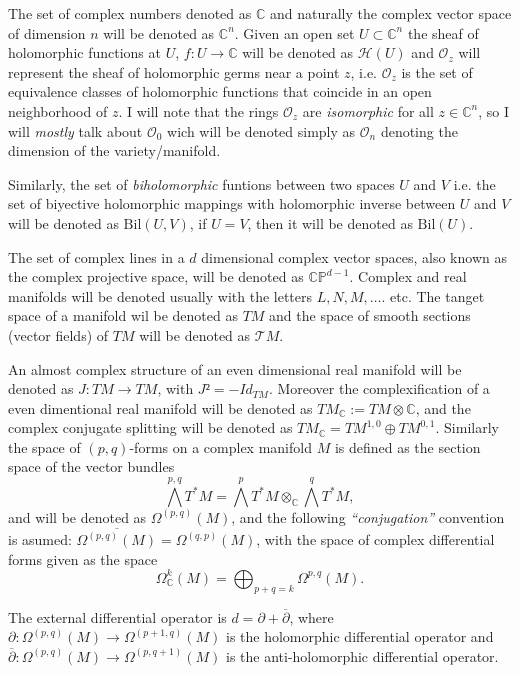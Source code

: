 \documentclass[12pt,twoside,a4paper]{report}
\newcommand{\co}{\ensuremath{\mathbb C }}
\newcommand{\con}{\ensuremath{\mathbb{C}^n}}
\newcommand{\cp}{\ensuremath{\mathbb{CP}}}
\newcommand{\om}{\ensuremath{\Omega}}
\newcommand{\osheaf}{\ensuremath{\mathcal O }}
\begin{document}
The set of complex numbers denoted as $\co$ and naturally the complex vector space of dimension $n$ will be denoted as $\con$. Given an open set $U\subset\con$ the sheaf of holomorphic functions at $U$, $f:U\rightarrow\co$ will be denoted as $\mathcal{H}(U)$ and $\osheaf_{z}$ will represent the sheaf of holomorphic germs near a point $z$, i.e. $\osheaf_{z}$ is the set of equivalence classes of holomorphic functions that coincide in an open neighborhood of $z$. I will note that the rings $\osheaf_{z}$ are \emph{isomorphic} for all $z\in\con$, so I will \emph{mostly} talk about $\osheaf_{0}$ wich will be denoted simply as $\osheaf_{n}$ denoting the dimension of the variety/manifold.

Similarly, the set of \emph{biholomorphic} funtions between two spaces $U$ and $V$ i.e. the set of biyective holomorphic mappings with holomorphic inverse between $U$ and $V$ will be denoted as $\mathrm{Bil}(U,V)$, if $U=V$, then it will be denoted as $\mathrm{Bil}(U).$

The set of complex lines in a $d$ dimensional complex vector spaces, also known as the complex projective space, will be denoted as $\cp^{d-1}$. Complex and real manifolds will be denoted usually with the letters $L, N, M,\dots$. etc. The tanget space of a manifold wil be denoted as $TM$ and the space of smooth sections (vector fields) of $TM$ will be denoted as $\mathcal{T}M$.

An almost complex structure of an even dimensional real manifold will be denoted as $J:TM\rightarrow TM$, with $J²=-Id_{TM}$. Moreover the complexification of a even dimentional real manifold will be denoted as $TM_{\co}:=TM\otimes\co$, and the complex conjugate splitting will be denoted as $TM_{\co}=TM^{1,0}\oplus TM^{0,1}$.
Similarly the space of $(p,q)$-forms on a complex manifold $M$ is  defined as the section space of the vector bundles
\[
  \bigwedge^{p,q}T^{*}M=\bigwedge^{p}T^{*}M\otimes_{\co}\bigwedge^{q}T^{*}M,
\]
\noindent and will be denoted as $\Omega^{(p,q)}(M)$, and the following \emph{``conjugation''} convention is asumed: $\overline{\om^{(p,q)}(M)}=\om^{(q,p)}(M)$, with the space of complex differential forms given as the space
\[
  \om^{k}_{\co}(M)=\bigoplus_{p+q=k}\om^{p,q}(M).
\]

The external differential operator is $d=\partial + \overline{\partial}$, where $\partial:\om^{(p,q)}(M)\rightarrow \om^{(p+1,q)}(M)$ is the holomorphic differential operator and $\overline{\partial}:\om^{(p,q)}(M)\rightarrow\om^{(p,q+1)}(M)$ is the anti-holomorphic differential operator.
\end{document}
